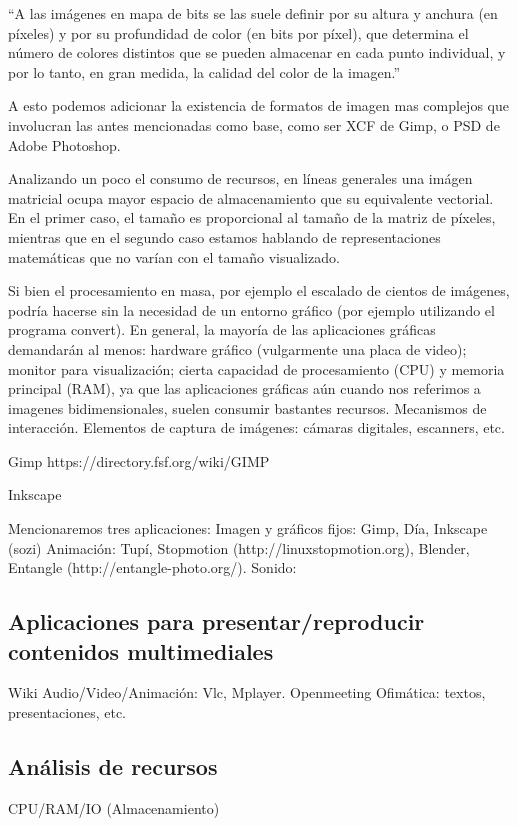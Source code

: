 \documentclass[12pt]{article}
\begin{document}
``A las imágenes en mapa de bits se las suele definir por su altura y anchura (en píxeles) y por 
su profundidad de color (en bits por píxel), que determina el número de colores distintos que se 
pueden almacenar en cada punto individual, y por lo tanto, en gran medida, la calidad del color de la imagen.''
\cite{wikiimes}

A esto podemos adicionar la existencia de formatos de imagen mas complejos que involucran las antes mencionadas
como base, como ser XCF de Gimp, o PSD de Adobe Photoshop. 

Analizando un poco el consumo de recursos, en líneas generales una imágen matricial ocupa mayor espacio de
almacenamiento que su equivalente vectorial. En el primer caso, el tamaño es proporcional al 
tamaño de la matriz de píxeles, mientras que en el segundo caso estamos hablando de representaciones
matemáticas que no varían con el tamaño visualizado.  

Si bien el procesamiento en masa, por ejemplo el escalado de cientos de imágenes, podría hacerse 
sin la necesidad de un entorno gráfico (por ejemplo utilizando el programa convert). 
En general, la mayoría de las aplicaciones gráficas demandarán al menos: hardware gráfico (vulgarmente una placa de video); 
monitor para visualización; cierta capacidad de procesamiento (CPU) y memoria principal (RAM), 
ya que las aplicaciones gráficas aún cuando nos referimos a imagenes bidimensionales, suelen consumir 
bastantes recursos. Mecanismos de interacción. Elementos de captura de imágenes: cámaras digitales, 
escanners, etc.  


Gimp
https://directory.fsf.org/wiki/GIMP

Inkscape

 

Mencionaremos tres aplicaciones: 
Imagen y gráficos fijos: Gimp, Día, Inkscape (sozi)
Animación: Tupí, Stopmotion (http://linuxstopmotion.org), Blender, 
Entangle (http://entangle-photo.org/).
Sonido:  

\textbf{}
\subsection*{Aplicaciones para presentar/reproducir contenidos multimediales}
Wiki
Audio/Video/Animación: Vlc, Mplayer. 
Openmeeting
Ofimática: textos, presentaciones, etc. 

\subsection*{Análisis de recursos}
CPU/RAM/IO (Almacenamiento)
\end{document}
